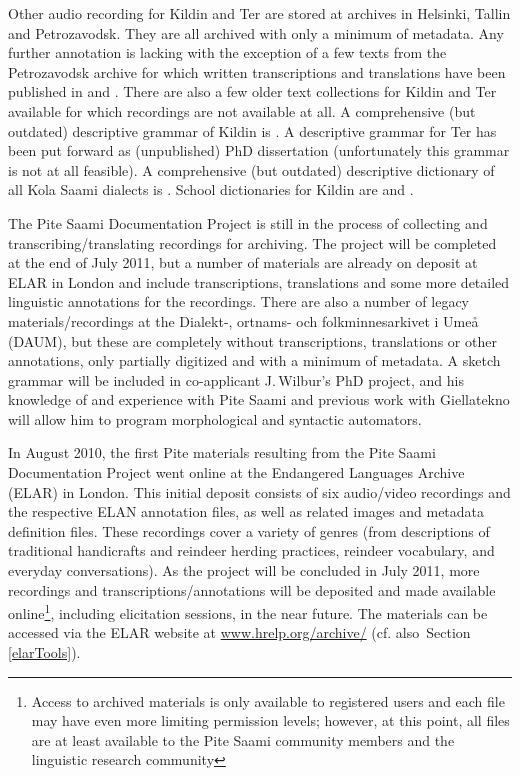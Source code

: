 \documentclass[a4paper,12pt]{article}
\begin{document}
Other audio recording for Kildin and Ter are stored at archives in Helsinki, Tallin and Petrozavodsk. They are all archived with only a minimum of metadata. Any further annotation is lacking with the exception of a few texts from the Petrozavodsk archive for which written transcriptions and translations have been published in \citealt{kert1961} and \citealt{panfilov-etal1988}. There are also a few older text collections for Kildin and Ter available for which recordings are not available at all. A comprehensive (but outdated) descriptive grammar of Kildin is \citealt{kert1971}. A descriptive grammar for Ter has been put forward as (unpublished) PhD dissertation \cite{tereskin2002a} (unfortunately this grammar is not at all feasible). A comprehensive (but outdated) descriptive dictionary of all Kola Saami dialects is \citealt{itkonen_t_i1958a}. School dictionaries for Kildin are \citealt{kuruc-etal1985} and \citealt{kert1986}.

The Pite Saami Documentation Project is still in the process of collecting and transcribing/translating recordings for archiving. The project will be completed at the end of July 2011, but a number of materials are already on deposit at ELAR in London and include transcriptions, translations and some more detailed linguistic annotations for the recordings. There are also a number of legacy materials/recordings at the Dialekt-, ortnams- och folkminnesarkivet i Umeå (DAUM), but these are completely without transcriptions, translations or other annotations, only partially digitized and with a minimum of metadata. A sketch grammar will be included in co-applicant J.\,Wilbur's PhD project, and his knowledge of and experience with Pite Saami and previous work with Giellatekno will allow him to program morphological and syntactic automators.

In August 2010, the first Pite materials resulting from the Pite Saami Documentation Project went online at the Endangered Languages Archive (ELAR) in London. This initial deposit consists of six audio/video recordings and the respective ELAN annotation files, as well as related images and metadata definition files. These recordings cover a variety of genres (from descriptions of traditional handicrafts and reindeer herding practices, reindeer vocabulary, and everyday conversations). As the project will be concluded in July 2011, more recordings and transcriptions/annotations will be deposited and made available online\footnote{Access to archived materials is only available to registered users and each file may have even more limiting permission levels; however, at this point, all files are at least available to the Pite Saami community members and the linguistic research community}, including elicitation sessions, in the near future. The materials can be accessed via the ELAR website at \url{www.hrelp.org/archive/} (cf. also~Section \ref{elarTools}).
\end{document}
